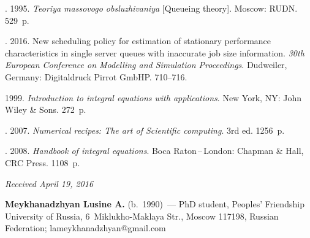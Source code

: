 \begin{multicols}{2}
{{\begin{thebibliography}{9}
. 1995.
\textit{Teoriya massovogo obsluzhivaniya} [Queueing theory].
Moscow: RUDN. 529~p.

. 2016.
New scheduling policy for estimation of stationary performance
characteristics in single server queues with inaccurate job size
information. \textit{30th European Conference on Modelling and Simulation Proceedings}.
Dudweiler, Germany: Digitaldruck Pirrot GmbHP. 710--716.



 1999.
\textit{Introduction to integral equations with applications}.
New York, NY: John Wiley \& Sons. 272~p.



. 2007.
\textit{Numerical recipes:  
The art of Scientific computing}. 3rd ed. 1256~p.

. 2008.
\textit{Handbook of integral equations}.
Boca Raton\,--\,London: Chapman \& Hall,
CRC Press. 1108~p.
\end{thebibliography}

 }
 }

\end{multicols}

\vspace*{-7pt}

\hfill{\small\textit{Received April 19, 2016}}

\vspace*{-17pt}
   

\Contrl

\vspace*{-2pt}

\noindent
\textbf{Meykhanadzhyan Lusine A.} (b.\ 1990)~---
PhD student, Peoples' Friendship University of Russia, 6~Miklukho-Maklaya Str., 
Moscow 117198, Russian Federation; lameykhanadzhyan@gmail.com

 
\label{end\stat}


\renewcommand{\bibname}{\protect\rm Литература}